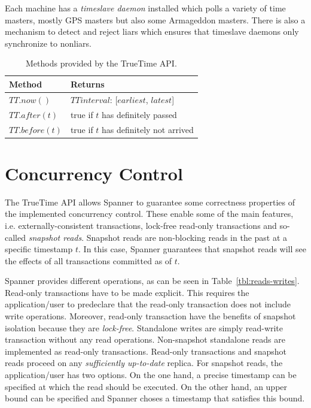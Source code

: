 \documentclass[onecolumn, a4paper, 10pt]{article}
\begin{document}
Each machine has a \emph{timeslave daemon} installed which polls a variety of
time masters, mostly GPS masters but also some Armageddon masters. There is also
a mechanism to detect and reject liars which ensures that timeslave daemons only
synchronize to nonliars. 

\begin{table}[ht]
  \centering
  \begin{tabular}{|l||l|}
    \hline
    {\bfseries Method} & {\bfseries Returns} \tabularnewline
    \hline\hline
    $TT.now()$ & $TTinterval$: [$earliest$, $latest$] \tabularnewline
    \hline
    $TT.after(t)$ & true if $t$ has definitely passed \tabularnewline
    \hline
    $TT.before(t)$ & true if $t$ has definitely not arrived \tabularnewline
    \hline
  \end{tabular}
  \caption{Methods provided by the TrueTime API.}
  \label{tbl:truetime-api}
\end{table}

\section{Concurrency Control}
\label{sec:concurrency-control}

The TrueTime API allows Spanner to guarantee some correctness properties of the
implemented concurrency control. These enable some of the main features, i.e.
externally-consistent transactions, lock-free read-only transactions and so-called
\emph{snapshot reads}. Snapshot reads are non-blocking reads in the past at a
specific timestamp $t$. In this case, Spanner guarantees that snapshot reads will
see the effects of all transactions committed as of $t$.

Spanner provides different operations, as can be seen in
Table~\ref{tbl:reads-writes}. Read-only transactions have to be made explicit.
This requires the application/user to predeclare that the read-only transaction
does not include write operations. Moreover, read-only transaction have the
benefits of snapshot isolation because they are \emph{lock-free}. Standalone
writes are simply read-write transaction without any read operations. Non-snapshot
standalone reads are implemented as read-only transactions. Read-only transactions
and snapshot reads proceed on any \emph{sufficiently up-to-date} replica. For
snapshot reads, the application/user has two options. On the one hand, a precise
timestamp can be specified at which the read should be executed. On the other
hand, an upper bound can be specified and Spanner choses a timestamp that
satisfies this bound. 
\end{document}
